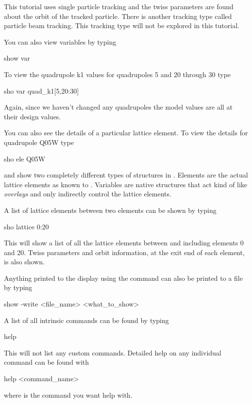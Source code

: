 This tutorial uses single particle tracking and the twiss parameters
are found about the orbit of the tracked particle. There is another
tracking type called particle beam tracking. This
tracking type will not be explored in this tutorial.

You can also view variables by typing
\begin{example}
  show var
\end{example}
To view the quadrupole k1 values for \cesr quadrupoles 5 and 20
through 30 type
\begin{example}
  sho var quad\_k1[5,20:30]
\end{example}
Again, since we haven't changed any quadrupoles the model values are
all at their design values.

You can also see the details of a particular lattice element. To view
the details for quadrupole Q05W type
\begin{example}
  sho ele Q05W
\end{example}

 and  show two completely different types of
structures in \tao. Elements are the actual lattice elements as known
to \bmad.  Variables are native \tao structures that act kind of like
\bmad \textit{overlays} and only indirectly control the lattice
elements.

A list of lattice elements between two elements can be shown by typing 
\begin{example}
  sho lattice 0:20
\end{example}
This will show a list of all the lattice elements between and
including elements 0 and 20. Twiss parameters and orbit information, at
the exit end of each element, is also shown.

Anything printed to the display using the  command can also
be printed to a file by typing
\begin{example}
  show -write <file_name> <what_to_show>
\end{example}

A list of all intrinsic  commands can be found by typing
\begin{example}
  help
\end{example}
This will not list any custom commands. Detailed help on any
individual command can be found with
\begin{example}
  help <command\_name>
\end{example}
where  is the command you want help with.

